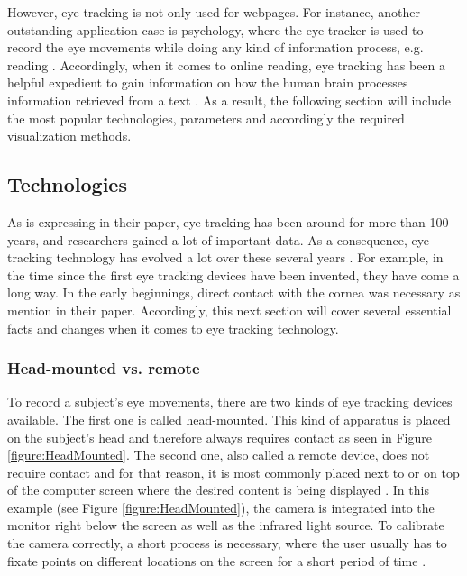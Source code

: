 However, eye tracking is not only used for webpages. For instance, another outstanding application case is psychology, where the eye tracker is used to record the eye movements while doing any kind of information process, e.g. reading \autocite{schiessl2003eye}.
Accordingly, when it comes to online reading, eye tracking has been a helpful expedient to gain information on how the human brain processes information retrieved from a text \autocite[]{schiessl2003eye}.
As a result, the following section will include the most popular technologies, parameters and accordingly the required visualization methods. 

\subsection{Technologies}
\label{subsection:Technologies}
As \textcite[]{biedert2010eyebook} is expressing in their paper, eye tracking has been around for more than 100 years, and researchers gained a lot of important data. As a consequence, eye tracking technology has evolved a lot over these several years \autocite[]{poole2006eye}.
For example, in the time since the first eye tracking devices have been invented, they have come a long way. In the early beginnings, direct contact with the cornea was necessary as \textcite[]{jacob2003eye} mention in their paper.
Accordingly, this next section will cover several essential facts and changes when it comes to eye tracking technology.

\subsubsection{Head-mounted vs. remote}
To record a subject's eye movements, there are two kinds of eye tracking devices available. The first one is called head-mounted. This kind of apparatus is placed on the subject's head and therefore always requires contact as seen in Figure \ref{figure:HeadMounted}. 
The second one, also called a remote device, does not require contact and for that reason, it is most commonly placed next to or on top of the computer screen where the desired content is being displayed \autocite[]{jacob2003eye, schiessl2003eye}. In this example (see Figure \ref{figure:HeadMounted}), the camera is integrated into the monitor right below the screen as well as the infrared light source. 
To calibrate the camera correctly, a short process is necessary, where the user usually has to fixate points on different locations on the screen for a short period of time \autocite{biedert2010eyebook}.

